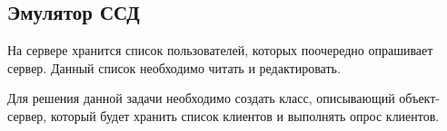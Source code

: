 % 
% 
% 
% 
% 
% 
% 
% 
% 
% 
% 
% 

\subsection{Эмулятор ССД}

На сервере хранится список пользователей, которых поочередно опрашивает сервер. Данный список необходимо читать и редактировать.

Для решения данной задачи необходимо создать класс, описывающий объект-сервер, который будет хранить список клиентов и выполнять опрос клиентов.

